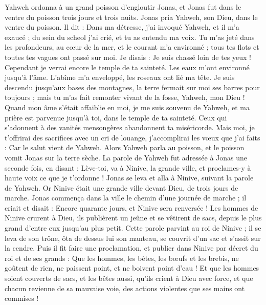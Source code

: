 \begin{multicols}{2}
\VerseOne{}Yahweh ordonna à un grand poisson d'engloutir Jonas, et Jonas fut dans le ventre du poisson trois jours et trois nuits.
Jonas pria Yahweh, son Dieu, dans le ventre du poisson.
Il dit : Dans ma détresse, j'ai invoqué Yahweh, et il m'a exaucé ; du sein du scheol j'ai crié, et tu as entendu ma voix.
Tu m'as jeté dans les profondeurs, au cœur de la mer, et le courant m'a environné ; tous tes flots et toutes tes vagues ont passé sur moi.
Je disais : Je suis chassé loin de tes yeux ! Cependant je verrai encore le temple de ta sainteté.
Les eaux m'ont environné jusqu'à l'âme. L'abîme m'a enveloppé, les roseaux ont lié ma tête.
Je suis descendu jusqu'aux bases des montagnes, la terre fermait sur moi ses barres pour toujours ; mais tu m'as fait remonter vivant de la fosse, Yahweh, mon Dieu !
Quand mon âme s'était affaiblie en moi, je me suis souvenu de Yahweh, et ma prière est parvenue jusqu'à toi, dans le temple de ta sainteté.
Ceux qui s'adonnent à des vanités mensongères abandonnent ta miséricorde.
Mais moi, je t'offrirai des sacrifices avec un cri de louange, j'accomplirai les vœux que j'ai faits : Car le salut vient de Yahweh.
Alors Yahweh parla au poisson, et le poisson vomit Jonas sur la terre sèche.
\VerseOne{}La parole de Yahweh fut adressée à Jonas une seconde fois, en disant :
Lève-toi, va à Ninive, la grande ville, et proclames-y à haute voix ce que je t'ordonne !
Jonas se leva et alla à Ninive, suivant la parole de Yahweh. Or Ninive était une grande ville devant Dieu, de trois jours de marche.
Jonas commença dans la ville le chemin d'une journée de marche ; il criait et disait : Encore quarante jours, et Ninive sera renversée !
Les hommes de Ninive crurent à Dieu, ils publièrent un jeûne et se vêtirent de sacs, depuis le plus grand d'entre eux jusqu'au plus petit.
Cette parole parvint au roi de Ninive ; il se leva de son trône, ôta de dessus lui son manteau, se couvrit d'un sac et s'assit sur la cendre.
Puis il fit faire une proclamation, et publier dans Ninive par décret du roi et de ses grands : Que les hommes, les bêtes, les bœufs et les brebis, ne goûtent de rien, ne paissent point, et ne boivent point d'eau !
Et que les hommes soient couverts de sacs, et les bêtes aussi, qu'ils crient à Dieu avec force, et que chacun revienne de sa mauvaise voie, des actions violentes que ses mains ont commises !

\end{multicols}
